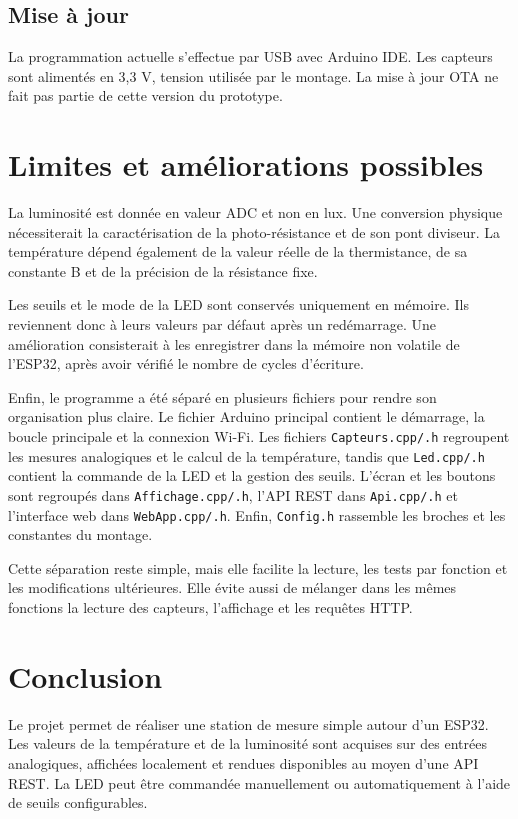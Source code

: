 \documentclass[12pt,a4paper]{report}
\begin{document}
\subsection{Mise à jour}

La programmation actuelle s'effectue par USB avec Arduino IDE. Les capteurs
sont alimentés en 3,3 V, tension utilisée par le montage. La mise à jour OTA
ne fait pas partie de cette version du prototype.

\section{Limites et améliorations possibles}

La luminosité est donnée en valeur ADC et non en lux. Une conversion physique
nécessiterait la caractérisation de la photo-résistance et de son pont
diviseur. La température dépend également de la valeur réelle de la
thermistance, de sa constante B et de la précision de la résistance fixe.

Les seuils et le mode de la LED sont conservés uniquement en mémoire. Ils
reviennent donc à leurs valeurs par défaut après un redémarrage. Une
amélioration consisterait à les enregistrer dans la mémoire non volatile de
l'ESP32, après avoir vérifié le nombre de cycles d'écriture.

Enfin, le programme a été séparé en plusieurs fichiers pour rendre son
organisation plus claire. Le fichier Arduino principal contient le démarrage,
la boucle principale et la connexion Wi-Fi. Les fichiers
\texttt{Capteurs.cpp/.h} regroupent les mesures analogiques et le calcul de la
température, tandis que \texttt{Led.cpp/.h} contient la commande de la LED et
la gestion des seuils. L'écran et les boutons sont regroupés dans
\texttt{Affichage.cpp/.h}, l'API REST dans \texttt{Api.cpp/.h} et
l'interface web dans \texttt{WebApp.cpp/.h}. Enfin,
\texttt{Config.h} rassemble les broches et les constantes du montage.

Cette séparation reste simple, mais elle facilite la lecture, les tests par
fonction et les modifications ultérieures. Elle évite aussi de mélanger dans
les mêmes fonctions la lecture des capteurs, l'affichage et les requêtes HTTP.

\section{Conclusion}

Le projet permet de réaliser une station de mesure simple autour d'un ESP32.
Les valeurs de la température et de la luminosité sont acquises sur des
entrées analogiques, affichées localement et rendues disponibles au moyen
d'une API REST. La LED peut être commandée manuellement ou automatiquement à
l'aide de seuils configurables.
\end{document}
